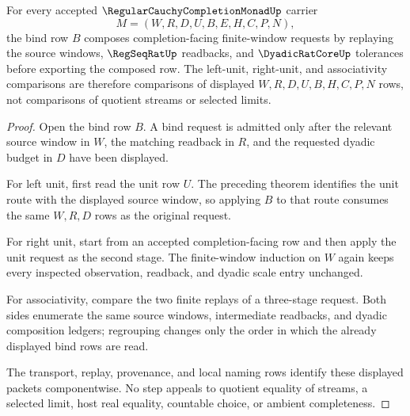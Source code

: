 \begin{theorem}
\label{thm:regular-cauchy-completion-monad-bind-laws}
For every accepted $\RegularCauchyCompletionMonadUp$ carrier
$$
M=(W,R,D,U,B,E,H,C,P,N),
$$
the bind row $B$ composes completion-facing finite-window requests by replaying the source windows, $\RegSeqRatUp$ readbacks, and $\DyadicRatCoreUp$ tolerances before exporting the composed row. The left-unit, right-unit, and associativity comparisons are therefore comparisons of displayed $W,R,D,U,B,H,C,P,N$ rows, not comparisons of quotient streams or selected limits.
\end{theorem}
\begin{proof}
Open the bind row $B$. A bind request is admitted only after the relevant source window in $W$, the matching readback in $R$, and the requested dyadic budget in $D$ have been displayed.

For left unit, first read the unit row $U$. The preceding theorem identifies the unit route with the displayed source window, so applying $B$ to that route consumes the same $W,R,D$ rows as the original request.

For right unit, start from an accepted completion-facing row and then apply the unit request as the second stage. The finite-window induction on $W$ again keeps every inspected observation, readback, and dyadic scale entry unchanged.

For associativity, compare the two finite replays of a three-stage request. Both sides enumerate the same source windows, intermediate readbacks, and dyadic composition ledgers; regrouping changes only the order in which the already displayed bind rows are read.

The transport, replay, provenance, and local naming rows identify these displayed packets componentwise. No step appeals to quotient equality of streams, a selected limit, host real equality, countable choice, or ambient completeness.
\end{proof}

